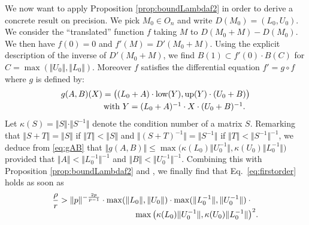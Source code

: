 \documentclass{sig-alternate}
\begin{document}
We now want to apply Proposition \ref{prop:boundLambdaf2}
in order to derive a concrete result on precision. We pick $M_0 \in
O_n$ and write $D(M_0) = (L_0,U_0)$. We consider the ``translated'' 
function $f$ taking $M$ to $D(M_0+M)-D(M_0)$. We then have $f(0) = 0$ 
and $f'(M) = D'(M_0+M)$. Using the explicit description of the inverse
of $D'(M_0+M)$, we find $B(1) \subset f'(0) \cdot B(C)$
for $C = \max(\Vert U_0 \Vert, \Vert L_0 \Vert)$. Moreover $f$ satisfies 
the differential equation $f' = g \circ f$ where $g$ is defined by:
\begin{equation}
\label{eq:gAB}
\begin{array}{l}
g(A,B)(X) = \big( (L_0+A) \cdot \low(Y), \up(Y) \cdot (U_0+B) \big)
\smallskip \\
\hspace{1.8cm}\text{with } Y = (L_0+A)^{-1} \cdot X \cdot (U_0+B)^{-1}.
\end{array}
\end{equation}
Let $\kappa(S) = \Vert S \Vert \cdot \Vert S^{-1} \Vert$ denote the 
condition number of a matrix $S$. Remarking that $\Vert S + T 
\Vert = \Vert S \Vert$ if $\Vert T \Vert < \Vert S \Vert$ and $\Vert (S 
+ T)^{-1} \Vert = \Vert S^{-1} \Vert$ if $\Vert T \Vert < \Vert S^{-1} 
\Vert^{-1}$, we deduce from \eqref{eq:gAB} that
$\Vert g(A,B) \Vert \leq \max 
\big( \kappa(L_0) \Vert U_0^{-1} \Vert, 
\kappa(U_0) \Vert L_0^{-1} \Vert \big)$
provided that $\Vert A \Vert < \Vert L_0^{-1} \Vert^{-1}$ and 
$\Vert B \Vert < \Vert U_0^{-1} \Vert^{-1}$.
Combining this with Proposition \ref{prop:boundLambdaf2} and 
\cite[Proposition.~3.12]{caruso-roe-vaccon:14a}, we finally find that 
Eq.~\eqref{eq:firstorder} holds as soon as 
$$\begin{array}{l}
\displaystyle \frac \rho r > \Vert p \Vert^{-\frac{2p}{p-1}} \cdot
\max ( \Vert L_0 \Vert, \Vert U_0 \Vert) \cdot
\max ( \Vert L_0 ^{-1} \Vert, \Vert U_0 ^{-1} \Vert) \cdot{} \\
\hspace{3.5cm} \max \big( \kappa(L_0) \Vert U_0^{-1} \Vert, 
  \kappa(U_0) \Vert L_0^{-1} \Vert \big)^2.
\end{array}$$
\end{document}
